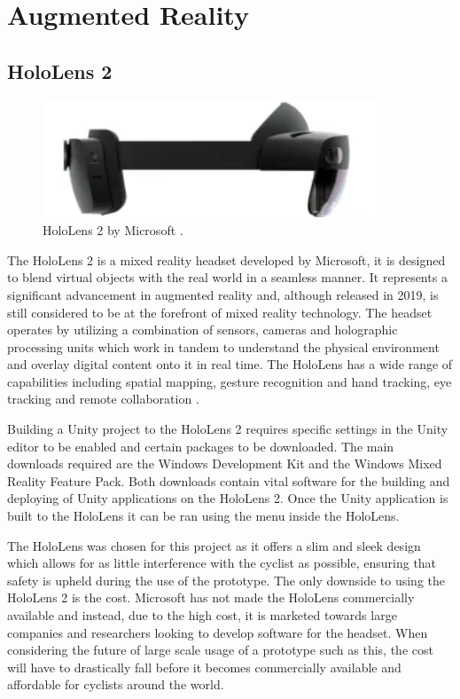 \documentclass{l4proj}
\begin{document}
\section{Augmented Reality}

\subsection{HoloLens 2}

\begin{figure}[H]
    \centering
    \includegraphics[width=10cm]{images/hololens.png}
    \caption{HoloLens 2 by Microsoft \citep{hololens_image}.}
    \label{fig:hololens}
\end{figure}

The HoloLens 2 is a mixed reality headset developed by Microsoft, it is designed to blend virtual objects with the real world in a seamless manner. It represents a significant advancement in augmented reality and, although released in 2019, is still considered to be at the forefront of mixed reality technology. The headset operates by utilizing a combination of sensors, cameras and holographic processing units which work in tandem to understand the physical environment and overlay digital content onto it in real time. The HoloLens has a wide range of capabilities including spatial mapping, gesture recognition and hand tracking, eye tracking and remote collaboration \citep{hololens}.

Building a Unity project to the HoloLens 2 requires specific settings in the Unity editor to be enabled and certain packages to be downloaded. The main downloads required are the Windows Development Kit and the Windows Mixed Reality Feature Pack. Both downloads contain vital software for the building and deploying of Unity applications on the HoloLens 2. Once the Unity application is built to the HoloLens it can be ran using the menu inside the HoloLens.

The HoloLens was chosen for this project as it offers a slim and sleek design which allows for as little interference with the cyclist as possible, ensuring that safety is upheld during the use of the prototype. The only downside to using the HoloLens 2 is the cost. Microsoft has not made the HoloLens commercially available and instead, due to the high cost, it is marketed towards large companies and researchers looking to develop software for the headset. When considering the future of large scale usage of a prototype such as this, the cost will have to drastically fall before it becomes commercially available and affordable for cyclists around the world.
\end{document}
